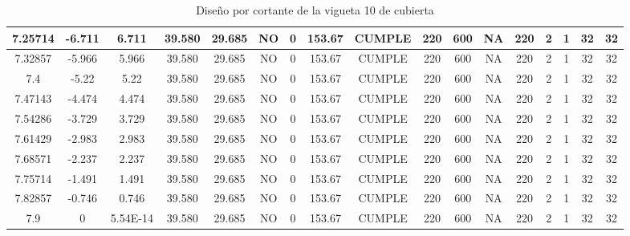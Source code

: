 \begin{table}[H]
{\begin{tabular}{|c|c|c|c|c|c|c|c|c|c|c|c|c|c|c|c|c|}
    \hline
    7.25714 & -6.711 & 6.711 & 39.580 & 29.685 & NO  & 0   & 153.67 & CUMPLE & 220 & 600 & NA  & 220 & 2   & 1   & 32  & 32 \bigstrut\\
    \hline
    7.32857 & -5.966 & 5.966 & 39.580 & 29.685 & NO  & 0   & 153.67 & CUMPLE & 220 & 600 & NA  & 220 & 2   & 1   & 32  & 32 \bigstrut\\
    \hline
    7.4 & -5.22 & 5.22 & 39.580 & 29.685 & NO  & 0   & 153.67 & CUMPLE & 220 & 600 & NA  & 220 & 2   & 1   & 32  & 32 \bigstrut\\
    \hline
    7.47143 & -4.474 & 4.474 & 39.580 & 29.685 & NO  & 0   & 153.67 & CUMPLE & 220 & 600 & NA  & 220 & 2   & 1   & 32  & 32 \bigstrut\\
    \hline
    7.54286 & -3.729 & 3.729 & 39.580 & 29.685 & NO  & 0   & 153.67 & CUMPLE & 220 & 600 & NA  & 220 & 2   & 1   & 32  & 32 \bigstrut\\
    \hline
    7.61429 & -2.983 & 2.983 & 39.580 & 29.685 & NO  & 0   & 153.67 & CUMPLE & 220 & 600 & NA  & 220 & 2   & 1   & 32  & 32 \bigstrut\\
    \hline
    7.68571 & -2.237 & 2.237 & 39.580 & 29.685 & NO  & 0   & 153.67 & CUMPLE & 220 & 600 & NA  & 220 & 2   & 1   & 32  & 32 \bigstrut\\
    \hline
    7.75714 & -1.491 & 1.491 & 39.580 & 29.685 & NO  & 0   & 153.67 & CUMPLE & 220 & 600 & NA  & 220 & 2   & 1   & 32  & 32 \bigstrut\\
    \hline
    7.82857 & -0.746 & 0.746 & 39.580 & 29.685 & NO  & 0   & 153.67 & CUMPLE & 220 & 600 & NA  & 220 & 2   & 1   & 32  & 32 \bigstrut\\
    \hline
    7.9 & 0   & 5.54E-14 & 39.580 & 29.685 & NO  & 0   & 153.67 & CUMPLE & 220 & 600 & NA  & 220 & 2   & 1   & 32  & 32 \bigstrut\\
    \hline
  
    \end{tabular}}%
    \caption{Diseño por cortante de la vigueta 10 de cubierta}
  \label{tab:CORT VT10 EP}%
\end{table}%